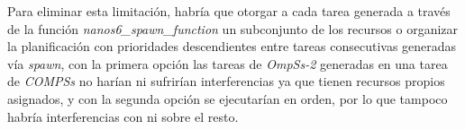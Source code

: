 \par\bigskip

Para eliminar esta limitación, habría que otorgar a cada tarea generada a través de la función \textit{nanos6\_spawn\_function} un subconjunto de los recursos o organizar la planificación con prioridades descendientes entre tareas consecutivas generadas vía \textit{spawn}, con la primera opción las tareas de \textit{OmpSs-2} generadas en una tarea de \textit{COMPSs} no harían ni sufrirían interferencias ya que tienen recursos propios asignados, y con la segunda opción se ejecutarían en orden, por lo que tampoco habría interferencias con ni sobre el resto.


